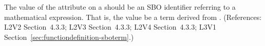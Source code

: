 The value of the  attribute on a \FunctionDefinition should be an
SBO identifier referring to a mathematical expression.  That is, the value
 be a term derived from \sbomathformula.  (References: L2V2 Section~4.3.3;
L2V3 Section~4.3.3; L2V4 Section~4.3.3; L3V1 Section~\ref{sec:functiondefinition-sboterm}.)
